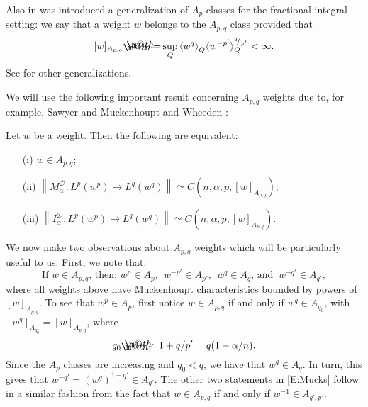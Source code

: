 \documentclass[12pt]{amsart}
\begin{document}
Also in \cite{MuckWheedenFrac} was introduced a generalization of $A_p$ classes for the fractional integral setting: we say that a weight $w$ belongs to the $A_{p,q}$ class provided that 
	$$[w]_{A_{p,q}} {\mathrel{\rlap{                     \raisebox{0.3ex}{$\m@th\cdot$}}                     \raisebox{-0.3ex}{$\m@th\cdot$}}                     =} \sup_Q {\langle } w^q{\rangle }_{Q} {\langle } w^{-p'}{\rangle }_Q^{{{}^{{q}}\!/_{{p'}}}} < \infty.$$
See \cites{Roch1993,RahSpe2015,CruMoe12013b,CruMoe2013a,Cru2015} for other
generalizations.

We will use the following
important result concerning $A_{p,q}$ weights due to, for example, Sawyer and Muckenhoupt and Wheeden
\cites{Saw1982,Saw1988,MuckWheedenFrac}:
\begin{thm}\label{T:maxIntBounds}
Let $w$ be a weight. Then the following are equivalent:
\begin{itemize}
 \item [(i)] $w\in A_{p,q}$;\\
 \item [(ii)] ${\ensuremath{\left\|{M_{\alpha}^{{\mathcal{{D}}}}:L^p(w^p)\to L^q(w^q)}\right\|}}
  \simeq C(n, \alpha, p, [w]_{A_{p,q}})$;\\
 \item [(iii)] ${\ensuremath{\left\|{I_{\alpha}^{{\mathcal{{D}}}}:L^p(w^p)\to L^q(w^q)}\right\|}}
  \simeq C(n, \alpha, p, [w]_{A_{p,q}})$.
\end{itemize}
\end{thm}

We now make two observations about $A_{p,q}$ weights which will be particularly useful to us. First, we note that:
	\begin{equation} \label{E:Mucks}
	\text{If } w \in A_{p,q} \text{, then: } w^p \in A_p,\:\: w^{-p'} \in A_{p'},\:\: w^q \in A_q\text{, and }\: w^{-q'} \in A_{q'},
	\end{equation}
where all weights above have Muckenhoupt characteristics bounded by powers of $[w]_{A_{p,q}}$.	
To see that $w^p \in A_p$, first notice $w \in A_{p,q}$ if and only if $w^q \in A_{q_0}$, with $[w^q]_{A_{q_0}} = [w]_{A_{p,q}}$, where
	$$q_0 {\mathrel{\rlap{                     \raisebox{0.3ex}{$\m@th\cdot$}}                     \raisebox{-0.3ex}{$\m@th\cdot$}}                     =} 1 + q/p'= q(1 - \alpha/n).$$
Since the $A_p$ classes are increasing and $q_0 < q$, we have that $w^q \in A_q$. In turn, this gives that $w^{-q'} = (w^q)^{1-q'} \in A_{q'}$.  The other two statements in \eqref{E:Mucks}
follow in a similar fashion from the fact that $w \in A_{p,q}$ if and only if $w^{-1} \in A_{q', p'}$.
	
\end{document}
